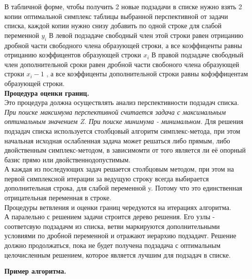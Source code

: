 В табличной форме, чтобы получить 2 новые подзадачи в списке нужно взять 2 копии оптимальной симплекс
таблицы выбранной перспективной от задачи списка, каждой копии нужно снизу добавить по одной строке для слабой переменной $y_i$
В левой подзадаче свободный член этой строки равен отрицанию дробной части свободного члена образующей строки,
а все коэффиценты равны отрицанию коэффицентов образующей строки $x_i$
В правой подзадаче свободный член дополнительной сроки равен дробной части свобоного члена образующей строки $x_i - 1$ ,
а все коэффиценты дополнительной строки равны кофэффицентам образующей строки.\\
\textbf{Процедура оценки границ.}\\
Это процедура должна осуществлять анализ перспективности подзадач списка.
\textit{При поиске максимума перспективной считается задача с максимальным оптимальным значением Z. При поиске минимума - минимальном.}
Для решения подзадач списка используется столбцовый алгоритм симплекс-метода, при этом начальная исходная ослабленная задача
может решаться либо прямым, либо двойственным симплекс-методом, в зависимомти от того является ли её опорный базис прямо или двойственнодопустимым.\\
А каждая из последующих задач решается столбцовым методом, при этом на первой симплексной итерации
за ведущую строку всегда выбирается дополнительная строка, для слабой переменной y.
Потому что это единственная отрицательная переменная в строке.\\
Процедуры ветвления и оценки границ чередуются на итерациях алгоритма.\\
А паралельно с решением задачи строится дерево решения. Его узлы - соответсвую подзадачм из списка,
ветви маркируются дополнительными условиями по дробной переменной и отражают иерархию подзадачт.
Решение должно продолжаться, пока не будет получена подзадача с оптимальным целочисленным решением,
которое является лучшим для подзадач в списке.

\textbf{Пример алгоритма.}\\


